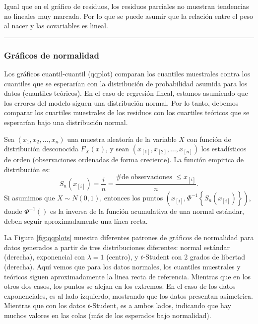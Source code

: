 \documentclass[
]{article}
\begin{document}
Igual que en el gráfico de residuos, los residuos parciales no muestran tendencias no lineales muy marcada. Por lo que se puede asumir que la relación entre el peso al nacer y las covariables es lineal.

\rule{\textwidth}{0.4pt}

\hypertarget{gruxe1ficos-de-normalidad}{%
\subsubsection{Gráficos de normalidad}\label{gruxe1ficos-de-normalidad}}

Los gráficos cuantil-cuantil (qqplot) comparan los cuantiles muestrales contra los cuantiles que se esperarían con la distribución de probabilidad asumida para los datos (cuantiles teóricos). En el caso de regresión lineal, estamos asumiendo que los errores del modelo siguen una distribución normal. Por lo tanto, debemos comparar los cuartiles muestrales de los residuos con los cuartiles teóricos que se esperarían bajo una distribución normal.

Sea \((x_{1},x_{2},\ldots,x_{n})\) una muestra aleatoría de la variable \(X\) con función de distribución desconocida \(F_{X}(x)\), y sean \((x_{[1]},x_{[2]},\ldots,x_{[n]})\) los estadísticos de orden (observaciones ordenadas de forma creciente). La función empirica de distribución es:
\[
S_{n}(x_{[i]}) = \frac{i}{n} = \frac{\mbox{\# de observaciones }\leq x_{[i]}}{n}.
\]
Si asumimos que \(X\sim N(0,1)\), entonces los puntos \((x_{[i]},\Phi^{-1}\left\{S_{n}(x_{[i]})\right\})\), donde \(\Phi^{-1}()\) es la inversa de la función acumulativa de una normal estándar, deben seguir aproximadamente una línea recta.

La Figura \ref{fig:qqplots} muestra diferentes patrones de gráficos de normalidad para datos generados a partir de tres distribuciones diferentes: normal estándar (derecha), exponencial con \(\lambda=1\) (centro), y \(t\)-Student con 2 grados de libertad (derecha). Aquí vemos que para los datos normales, los cuantiles muestrales y teóricos siguen aproximadamente la linea recta de referencia. Mientras que en los otros dos casos, los puntos se alejan en los extremos. En el caso de los datos exponenciales, es al lado izquierdo, mostrando que los datos presentan asímetrica. Mientras que con los datos \(t\)-Student, es a ambos lados, indicando que hay muchos valores en las colas (más de los esperados bajo normalidad).
\end{document}
